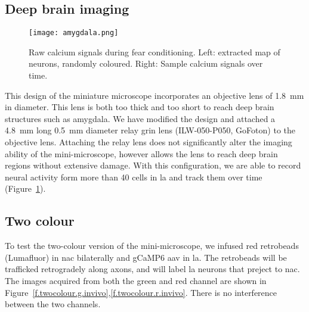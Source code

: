 \subsection{Deep brain imaging}
\begin{figure}[h]
    \centering
    \texttt{[image: amygdala.png]}
    \caption{Raw calcium signals during fear conditioning. Left: extracted map of neurons, randomly coloured. Right: Sample calcium signals over time.\label{f.amygdala}}

\end{figure}
This design of the miniature microscope incorporates an objective lens of \SI{1.8}{\mm} in diameter. This lens is both too thick and too short to reach deep brain structures such as amygdala. We have modified the design and attached a \SI{4.8}{\mm} long \SI{0.5}{\mm} diameter relay \gls{grin} lens (ILW-050-P050, GoFoton) to the objective lens. Attaching the relay lens does not significantly alter the imaging ability of the mini-microscope, however allows the lens to reach deep brain regions without extensive damage. With this configuration, we are able to record neural activity form more than 40 cells in \gls{la} and track them over time (Figure~\ref{f.amygdala}).

\subsection{Two colour}
To test the two-colour version of the mini-microscope, we infused red retrobeads (Lumafluor) in \gls{nac} bilaterally and gCaMP6 \gls{aav} in \gls{la}. The retrobeads will be trafficked retrogradely along axons, and will label \gls{la} neurons that preject to \gls{nac}. The images acquired from both the green and red channel are shown in Figure~\ref{f.twocolour.g.invivo},\ref{f.twocolour.r.invivo}. There is no interference between the two channels.

